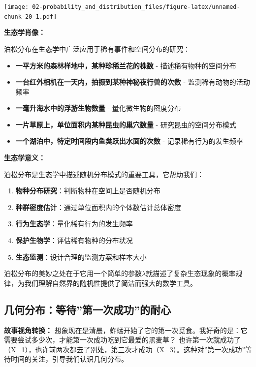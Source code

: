 \documentclass[
  twoside]{book}
\providecommand{\tightlist}{%
  \setlength{\itemsep}{0pt}\setlength{\parskip}{0pt}}
\begin{document}
\texttt{[image: 02-probability\_and\_distribution\_files/figure-latex/unnamed-chunk-20-1.pdf]}

\textbf{生态学肖像：}

泊松分布在生态学中广泛应用于稀有事件和空间分布的研究：

\begin{itemize}
\tightlist
\item
  \textbf{一平方米的森林样地中，某种珍稀兰花的株数} - 描述稀有物种的空间分布
\item
  \textbf{一台红外相机在一天内，拍摄到某种神秘夜行兽的次数} - 监测稀有动物的活动频率
\item
  \textbf{一毫升海水中的浮游生物数量} - 量化微生物的密度分布
\item
  \textbf{一片草原上，单位面积内某种昆虫的巢穴数量} - 研究昆虫的空间分布模式
\item
  \textbf{一个湖泊中，特定时间段内鱼类跃出水面的次数} - 记录稀有行为的发生频率
\end{itemize}

\textbf{生态学意义：}

泊松分布是生态学中描述随机分布模式的重要工具，它帮助我们：

\begin{enumerate}
\def\labelenumi{\arabic{enumi}.}
\tightlist
\item
  \textbf{物种分布研究}：判断物种在空间上是否随机分布
\item
  \textbf{种群密度估计}：通过单位面积内的个体数估计总体密度
\item
  \textbf{行为生态学}：量化稀有行为的发生频率
\item
  \textbf{保护生物学}：评估稀有物种的分布状况
\item
  \textbf{生态监测}：设计合理的监测方案和样本大小
\end{enumerate}

泊松分布的美妙之处在于它用一个简单的参数\(\lambda\)就描述了复杂生态现象的概率规律，为我们理解自然界的随机性提供了简洁而强大的数学工具。

\hypertarget{ux51e0ux4f55ux5206ux5e03ux7b49ux5f85ux7b2cux4e00ux6b21ux6210ux529fux7684ux8010ux5fc3}{%
\subsection{几何分布：等待''第一次成功''的耐心}\label{ux51e0ux4f55ux5206ux5e03ux7b49ux5f85ux7b2cux4e00ux6b21ux6210ux529fux7684ux8010ux5fc3}}

\textbf{故事视角转换：} 想象现在是清晨，蚱蜢开始了它的第一次觅食。我好奇的是：它需要尝试多少次，才能第一次成功吃到它最爱的黑麦草？ 也许第一次就成功了（X=1），也许前两次都去了别处，第三次才成功（X=3）。这种对''第一次成功''等待时间的关注，引导我们认识几何分布。
\end{document}

